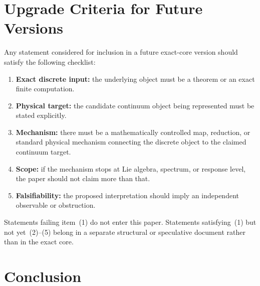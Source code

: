 \documentclass[12pt,a4paper]{article}
\theoremstyle{definition}
\begin{document}
\section{Upgrade Criteria for Future Versions}

Any statement considered for inclusion in a future exact-core version should satisfy the following checklist:
\begin{enumerate}
\item \textbf{Exact discrete input:} the underlying object must be a theorem or an exact finite computation.
\item \textbf{Physical target:} the candidate continuum object being represented must be stated explicitly.
\item \textbf{Mechanism:} there must be a mathematically controlled map, reduction, or standard physical mechanism connecting the discrete object to the claimed continuum target.
\item \textbf{Scope:} if the mechanism stops at Lie algebra, spectrum, or response level, the paper should not claim more than that.
\item \textbf{Falsifiability:} the proposed interpretation should imply an independent observable or obstruction.
\end{enumerate}
Statements failing item~(1) do not enter this paper.  Statements satisfying~(1) but not yet~(2)--(5) belong in a separate structural or speculative document rather than in the exact core.

\section{Conclusion}
\end{document}
